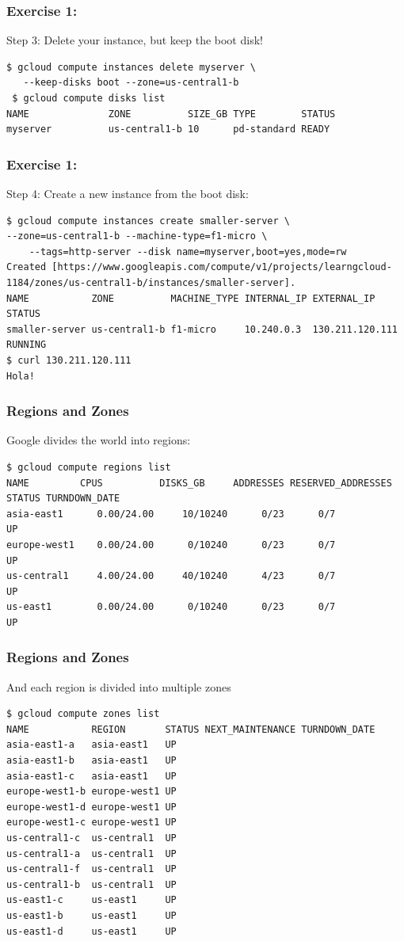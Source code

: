 \documentclass[9pt]{beamer}
\begin{document}
\begin{frame}[fragile]
\frametitle{Exercise 1:}
Step 3: Delete your instance, but keep the boot disk!
\begin{verbatim}
$ gcloud compute instances delete myserver \
   --keep-disks boot --zone=us-central1-b
 $ gcloud compute disks list
NAME              ZONE          SIZE_GB TYPE        STATUS
myserver          us-central1-b 10      pd-standard READY
\end{verbatim}

\end{frame}

\begin{frame}[fragile]
\frametitle{Exercise 1:}
Step 4: Create a new instance from the boot disk:
\begin{verbatim}
$ gcloud compute instances create smaller-server \
--zone=us-central1-b --machine-type=f1-micro \
    --tags=http-server --disk name=myserver,boot=yes,mode=rw
Created [https://www.googleapis.com/compute/v1/projects/learngcloud-1184/zones/us-central1-b/instances/smaller-server].
NAME           ZONE          MACHINE_TYPE INTERNAL_IP EXTERNAL_IP     STATUS
smaller-server us-central1-b f1-micro     10.240.0.3  130.211.120.111 RUNNING
$ curl 130.211.120.111
Hola!
\end{verbatim}
\end{frame}

\begin{frame}[fragile]
  \frametitle{Regions and Zones}
  Google divides the world into regions:
  \begin{verbatim}
$ gcloud compute regions list
NAME         CPUS          DISKS_GB     ADDRESSES RESERVED_ADDRESSES STATUS TURNDOWN_DATE
asia-east1      0.00/24.00     10/10240      0/23      0/7           UP
europe-west1    0.00/24.00      0/10240      0/23      0/7           UP
us-central1     4.00/24.00     40/10240      4/23      0/7           UP
us-east1        0.00/24.00      0/10240      0/23      0/7           UP
  \end{verbatim}
\end{frame}

\begin{frame}[fragile]
  \frametitle{Regions and Zones}
  And each region is divided into multiple zones
\begin{verbatim}
$ gcloud compute zones list
NAME           REGION       STATUS NEXT_MAINTENANCE TURNDOWN_DATE
asia-east1-a   asia-east1   UP
asia-east1-b   asia-east1   UP
asia-east1-c   asia-east1   UP
europe-west1-b europe-west1 UP
europe-west1-d europe-west1 UP
europe-west1-c europe-west1 UP
us-central1-c  us-central1  UP
us-central1-a  us-central1  UP
us-central1-f  us-central1  UP
us-central1-b  us-central1  UP
us-east1-c     us-east1     UP
us-east1-b     us-east1     UP
us-east1-d     us-east1     UP
\end{verbatim}
\end{frame}
\end{document}
